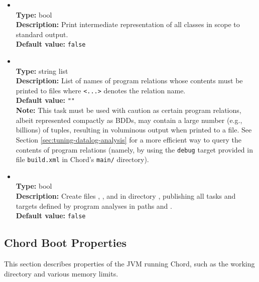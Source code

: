 \begin{itemize}
\item
{} \\
{\bf Type:} bool \\
{\bf Description:} Print intermediate representation of all classes in scope to standard output. \\
{\bf Default value:} {\tt false}

\item
{} \\
{\bf Type:} string list \\
{\bf Description:} List of names of program relations whose contents must be printed to files  where {\tt <...>} denotes the relation name. \\
{\bf Default value:} {\tt ""} \\
{\bf Note:} This task must be used with caution as certain program relations, albeit represented compactly as BDDs, may contain a large number (e.g., billions) of tuples, resulting in voluminous output when printed to a file.  See Section \ref{sec:tuning-datalog-analysis} for a more efficient way to query the contents of program relations (namely, by using the {\tt debug} target provided in file {\tt build.xml} in Chord's {\tt main/} directory).

\item
{} \\
{\bf Type:} bool \\
{\bf Description:} Create files , , and  in directory , publishing all tasks and targets defined by program analyses in paths  and . \\
{\bf Default value:} {\tt false}
\end{itemize}

\subsection{Chord Boot Properties}

This section describes properties of the JVM running Chord, such as the working directory and various memory limits.
 
